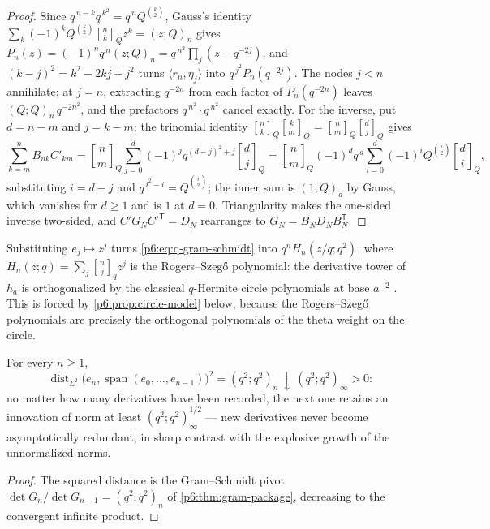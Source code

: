 \documentclass[11pt,oneside]{article}
\numberwithin{equation}{section}
\theoremstyle{definition}
\theoremstyle{remark}
\newcommand{\qbinom}[3]{\genfrac{[}{]}{0pt}{}{#1}{#2}_{#3}}
\begin{document}
\begin{proof}
Since $q^{\,n-k}q^{\,k^2}=q^{\,n}Q^{\binom k2}$, Gauss's identity
$\sum_k(-1)^kQ^{\binom k2}\qbinom{n}{k}{Q}z^k=(z;Q)_n$ gives
$P_n(z)=(-1)^nq^{\,n}(z;Q)_n=q^{\,n^2}\prod_j(z-q^{-2j})$, and
$(k-j)^2=k^2-2kj+j^2$ turns $\langle r_n,\eta_j\rangle$ into
$q^{\,j^2}P_n(q^{-2j})$.  The nodes $j<n$ annihilate; at $j=n$,
extracting $q^{-2n}$ from each factor of $P_n(q^{-2n})$ leaves
$(Q;Q)_n\,q^{-2n^2}$, and the prefactors $q^{\,n^2}\cdot q^{\,n^2}$
cancel exactly.  For the inverse, put $d=n-m$ and $j=k-m$; the trinomial identity
$\qbinom{n}{k}{Q}\qbinom{k}{m}{Q}
=\qbinom{n}{m}{Q}\qbinom{d}{j}{Q}$ gives
\[
 \sum_{k=m}^{n}B_{nk}C'_{km}
 =\qbinom{n}{m}{Q}\sum_{j=0}^{d}(-1)^jq^{(d-j)^2+j}\qbinom{d}{j}{Q}
 =\qbinom{n}{m}{Q}(-1)^dq^{\,d}
 \sum_{i=0}^{d}(-1)^iQ^{\binom i2}\qbinom{d}{i}{Q},
\]
substituting $i=d-j$ and $q^{\,i^2-i}=Q^{\binom i2}$; the inner sum is
$(1;Q)_d$ by Gauss, which vanishes for $d\ge1$ and is $1$ at $d=0$.  Triangularity makes the one-sided inverse
two-sided, and $C'G_NC'^{\mathsf T}=D_N$ rearranges to
$G_N=B_ND_NB_N^{\mathsf T}$.
\end{proof}

\begin{remark}\label{p6:rem:rogers-szegoe}
Substituting $e_j\mapsto z^j$ turns \eqref{p6:eq:q-gram-schmidt} into
$q^nH_n(z/q;q^2)$, where $H_n(z;q)=\sum_j\qbinom{n}{j}{q}z^j$ is the
Rogers--Szeg\H{o} polynomial: the derivative tower of $h_a$ is
orthogonalized by the classical $q$-Hermite circle polynomials at base
$a^{-2}$ \cite{p6:ismail}.  This is forced by \cref{p6:prop:circle-model}
below, because the Rogers--Szeg\H{o} polynomials are precisely the
orthogonal polynomials of the theta weight on the circle.
\end{remark}

\begin{corollary}\label{p6:cor:innovation-distance}
For every $n\ge1$,
\[
 \operatorname{dist}_{L^2}
 \bigl(e_n,\operatorname{span}(e_0,\ldots,e_{n-1})\bigr)^2
 =(q^2;q^2)_n\ \downarrow\ (q^2;q^2)_\infty>0:
\]
no matter how many derivatives have been recorded, the next one retains an
innovation of norm at least $(q^2;q^2)_\infty^{1/2}$ --- new derivatives
never become asymptotically redundant, in sharp contrast with the explosive
growth of the unnormalized norms.
\end{corollary}

\begin{proof}
The squared distance is the Gram--Schmidt pivot
$\det G_n/\det G_{n-1}=(q^2;q^2)_n$ of \cref{p6:thm:gram-package},
decreasing to the convergent infinite product.
\end{proof}
\end{document}
